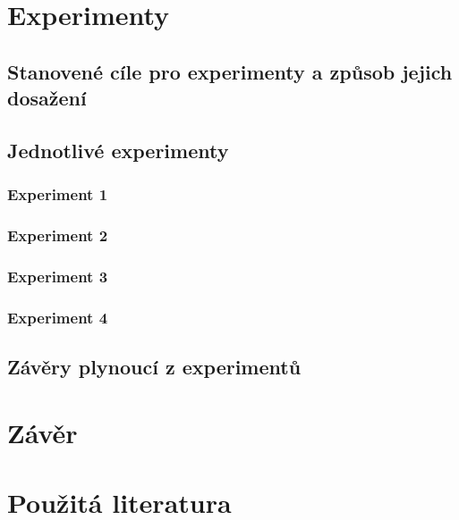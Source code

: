\documentclass[a4paper,11pt]{article}
\begin{document}
\section{Experimenty}
\subsection{Stanovené cíle pro experimenty a způsob jejich dosažení}
\subsection{Jednotlivé experimenty}
\subsubsection{Experiment 1}
\subsubsection{Experiment 2}
\subsubsection{Experiment 3}
\subsubsection{Experiment 4}
\subsection{Závěry plynoucí z experimentů}
\section{Závěr}
\section{Použitá literatura}

\nocite{*}




\newpage
\thispagestyle{empty}
\end{document}
